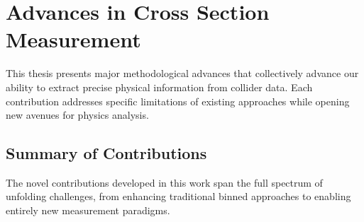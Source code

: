 \section{Advances in Cross Section Measurement}
    This thesis presents major methodological advances that collectively advance our ability to extract precise physical information from collider data.
    Each contribution addresses specific limitations of existing approaches while opening new avenues for physics analysis.
    \subsection{Summary of Contributions}
        The novel contributions developed in this work span the full spectrum of unfolding challenges, from enhancing traditional binned approaches to enabling entirely new measurement paradigms.
